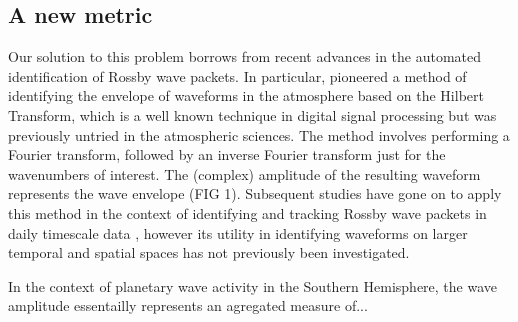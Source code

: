 \subsection{A new metric}

Our solution to this problem borrows from recent advances in the automated identification of Rossby wave packets. In particular, \citet{Zimin2003} pioneered a method of identifying the envelope of waveforms in the atmosphere based on the Hilbert Transform, which is a well known technique in digital signal processing but was previously untried in the atmospheric sciences. The method involves performing a Fourier transform, followed by an inverse Fourier transform just for the wavenumbers of interest. The (complex) amplitude of the resulting waveform represents the wave envelope (FIG 1). Subsequent studies have gone on to apply this method in the context of identifying and tracking Rossby wave packets in daily timescale data \citep{Glatt2014,Souders2014a}, however its utility in identifying waveforms on larger temporal and spatial spaces has not previously been investigated.

In the context of planetary wave activity in the Southern Hemisphere, the wave amplitude essentailly represents an agregated measure of... 